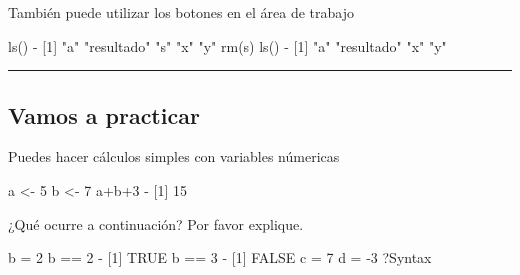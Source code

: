 \documentclass[
]{book}
\newenvironment{Shaded}{\begin{snugshade}}{\end{snugshade}}
\newcommand{\ConstantTok}[1]{\textcolor[rgb]{0.00,0.00,0.00}{#1}}
\newcommand{\DecValTok}[1]{\textcolor[rgb]{0.00,0.00,0.81}{#1}}
\newcommand{\FunctionTok}[1]{\textcolor[rgb]{0.00,0.00,0.00}{#1}}
\newcommand{\NormalTok}[1]{#1}
\newcommand{\OtherTok}[1]{\textcolor[rgb]{0.56,0.35,0.01}{#1}}
\newcommand{\SpecialCharTok}[1]{\textcolor[rgb]{0.00,0.00,0.00}{#1}}
\newcommand{\StringTok}[1]{\textcolor[rgb]{0.31,0.60,0.02}{#1}}
\begin{document}
También puede utilizar los botones en el área de trabajo

\begin{Shaded}
\begin{Highlighting}[]
\FunctionTok{ls}\NormalTok{()}
\SpecialCharTok{{-}}\NormalTok{ [}\DecValTok{1}\NormalTok{] }\StringTok{"a"}         \StringTok{"resultado"} \StringTok{"s"}         \StringTok{"x"}         \StringTok{"y"}
\FunctionTok{rm}\NormalTok{(s)}
\FunctionTok{ls}\NormalTok{()}
\SpecialCharTok{{-}}\NormalTok{ [}\DecValTok{1}\NormalTok{] }\StringTok{"a"}         \StringTok{"resultado"} \StringTok{"x"}         \StringTok{"y"}
\end{Highlighting}
\end{Shaded}

\begin{center}\rule{0.5\linewidth}{0.5pt}\end{center}

\hypertarget{vamos-a-practicar}{%
\subsection{Vamos a practicar}\label{vamos-a-practicar}}

Puedes hacer cálculos simples con variables númericas

\begin{Shaded}
\begin{Highlighting}[]
\NormalTok{a }\OtherTok{\textless{}{-}} \DecValTok{5}
\NormalTok{b }\OtherTok{\textless{}{-}} \DecValTok{7}
\NormalTok{a}\SpecialCharTok{+}\NormalTok{b}\SpecialCharTok{+}\DecValTok{3}
\SpecialCharTok{{-}}\NormalTok{ [}\DecValTok{1}\NormalTok{] }\DecValTok{15}
\end{Highlighting}
\end{Shaded}

¿Qué ocurre a continuación? Por favor explique.

\begin{Shaded}
\begin{Highlighting}[]
\NormalTok{b }\OtherTok{=} \DecValTok{2}
\NormalTok{b }\SpecialCharTok{==} \DecValTok{2}
\SpecialCharTok{{-}}\NormalTok{ [}\DecValTok{1}\NormalTok{] }\ConstantTok{TRUE}
\NormalTok{b }\SpecialCharTok{==} \DecValTok{3}
\SpecialCharTok{{-}}\NormalTok{ [}\DecValTok{1}\NormalTok{] }\ConstantTok{FALSE}
\NormalTok{c }\OtherTok{=} \DecValTok{7}
\NormalTok{d }\OtherTok{=} \SpecialCharTok{{-}}\DecValTok{3}
\NormalTok{?Syntax}
\end{Highlighting}
\end{Shaded}
\end{document}
